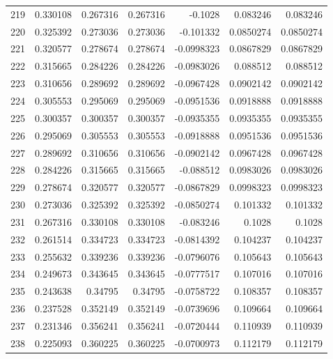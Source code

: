 \begin{tabular}{rrrrrrr}
 219 &  0.330108    & 0.267316    & 0.267316    & -0.1028      & 0.083246    & 0.083246    \\
 220 &  0.325392    & 0.273036    & 0.273036    & -0.101332    & 0.0850274   & 0.0850274   \\
 221 &  0.320577    & 0.278674    & 0.278674    & -0.0998323   & 0.0867829   & 0.0867829   \\
 222 &  0.315665    & 0.284226    & 0.284226    & -0.0983026   & 0.088512    & 0.088512    \\
 223 &  0.310656    & 0.289692    & 0.289692    & -0.0967428   & 0.0902142   & 0.0902142   \\
 224 &  0.305553    & 0.295069    & 0.295069    & -0.0951536   & 0.0918888   & 0.0918888   \\
 225 &  0.300357    & 0.300357    & 0.300357    & -0.0935355   & 0.0935355   & 0.0935355   \\
 226 &  0.295069    & 0.305553    & 0.305553    & -0.0918888   & 0.0951536   & 0.0951536   \\
 227 &  0.289692    & 0.310656    & 0.310656    & -0.0902142   & 0.0967428   & 0.0967428   \\
 228 &  0.284226    & 0.315665    & 0.315665    & -0.088512    & 0.0983026   & 0.0983026   \\
 229 &  0.278674    & 0.320577    & 0.320577    & -0.0867829   & 0.0998323   & 0.0998323   \\
 230 &  0.273036    & 0.325392    & 0.325392    & -0.0850274   & 0.101332    & 0.101332    \\
 231 &  0.267316    & 0.330108    & 0.330108    & -0.083246    & 0.1028      & 0.1028      \\
 232 &  0.261514    & 0.334723    & 0.334723    & -0.0814392   & 0.104237    & 0.104237    \\
 233 &  0.255632    & 0.339236    & 0.339236    & -0.0796076   & 0.105643    & 0.105643    \\
 234 &  0.249673    & 0.343645    & 0.343645    & -0.0777517   & 0.107016    & 0.107016    \\
 235 &  0.243638    & 0.34795     & 0.34795     & -0.0758722   & 0.108357    & 0.108357    \\
 236 &  0.237528    & 0.352149    & 0.352149    & -0.0739696   & 0.109664    & 0.109664    \\
 237 &  0.231346    & 0.356241    & 0.356241    & -0.0720444   & 0.110939    & 0.110939    \\
 238 &  0.225093    & 0.360225    & 0.360225    & -0.0700973   & 0.112179    & 0.112179    \\

\end{tabular}
